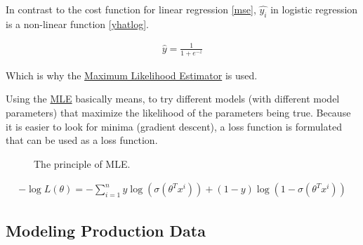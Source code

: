 \documentclass[
  a4paper,
]{scrbook}
\begin{document}
In contrast to the cost function for linear regression \eqref{mse},
\(\hat{y_i}\) in logistic regression is a non-linear function
\eqref{yhatlog}.

\begin{align}
\hat{y} = \frac{1}{1+e^{-z}} \label{yhatlog}
\end{align}

Which is why the \hyperref[MLE]{Maximum Likelihood Estimator} is used.

Using the \hyperref[MLE]{MLE} basically means, to try different models
(with different model parameters) that maximize the likelihood of the
parameters being true. Because it is easier to look for minima (gradient
descent), a loss function is formulated that can be used as a loss
function.

\begin{figure}[H]


\caption{\label{fig-mle}The principle of MLE.}

\end{figure}%

\begin{align}
-\log L(\theta) = -\sum_{i=1}^{n} y \log(\sigma(\theta^Tx^i)) + (1-y)\log(1-\sigma(\theta^Tx^i)) \label{logresloss}
\end{align}

\subsection{Modeling Production Data}\label{modeling-production-data}
\end{document}
